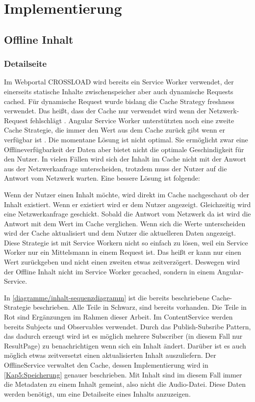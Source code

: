 \chapter{Implementierung}
\label{Kap5}

\section{Offline Inhalt}

\subsection{Detailseite}
Im Webportal CROSSLOAD wird bereits ein Service Worker verwendet, der einerseits statische Inhalte zwischenspeicher aber auch dynamische Requests cached. Für dynamische Request wurde bislang die Cache Strategy freshness verwendet. Das heißt, dass der Cache nur verwendet wird wenn der Netzwerk-Request fehlschlägt \autocite{angular-service-worker}. Angular Service Worker unterstützten noch eine zweite Cache Strategie, die immer den Wert aus dem Cache zurück gibt wenn er verfügbar ist \autocite{angular-service-worker}. Die momentane Lösung ist nicht optimal. Sie ermöglicht zwar eine Offlineverfügbarkeit der Daten aber bietet nicht die optimale Geschindigkeit für den Nutzer. In vielen Fällen wird sich der Inhalt im Cache nicht mit der Anwort aus der Netzwerkanfrage unterscheiden, trotzdem muss der Nutzer auf die Antwort vom Netzwerk warten. Eine bessere Lösung ist folgende:

Wenn der Nutzer einen Inhalt möchte, wird direkt im Cache nachgeschaut ob der Inhalt existiert. Wenn er existiert wird er dem Nutzer angezeigt. Gleichzeitig wird eine Netzwerkanfrage geschickt. Sobald die Antwort vom Netzwerk da ist wird die Antwort mit dem Wert im Cache verglichen. Wenn sich die Werte unterscheiden wird der Cache aktualisiert und dem Nutzer die aktuelleren Daten angezeigt. Diese Strategie ist mit Service Workern nicht so einfach zu lösen, weil ein Service Worker nur ein Mittelsmann in einem Request ist. Das heißt er kann nur einen Wert zurückgeben und nicht einen zweiten etwas zeitverzögert. Deswegen wird der Offline Inhalt nicht im Service Worker gecached, sondern in einem Angular-Service.


In \autoref{diagramme/inhalt-sequenzdiagramm} ist die bereits beschriebene Cache-Strategie beschrieben. Alle Teile in Schwarz, sind bereits vorhanden. Die Teile in Rot sind Ergänzungen im Rahmen dieser Arbeit. Im ContentService werden bereits Subjects und Observables verwendet. Durch das Publish-Subsribe Pattern, das dadurch erzeugt wird ist es möglich mehrere Subscriber (in diesem Fall nur ResultPage) zu benachrichtigen wenn sich ein Inhalt ändert. Darüber ist es auch möglich etwas zeitversetzt einen aktualisierten Inhalt auszuliefern. Der OfflineService verwaltet den Cache, dessen Implementierung wird in \autoref{Kap5:Speicherung} genauer beschrieben. Mit Inhalt sind im diesem Fall immer die Metadaten zu einem Inhalt gemeint, also nicht die Audio-Datei. Diese Daten werden benötigt, um eine Detailseite eines Inhalts anzuzeigen.

